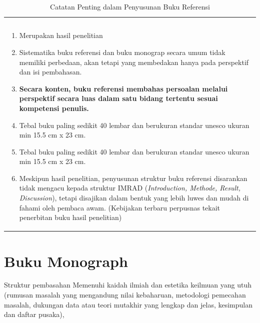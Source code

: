 \documentclass{bukupedia}
\begin{document}
\begin{table}[htbp]
  \centering
  \caption{Catatan Penting dalam Penyusunan Buku Referensi}
  \label{tab:buku-referensi}
  {\fontsize{8}{10}\selectfont
  \begin{tabularx}{\textwidth}{|X|}
    \hline
    \rowcolor{kepalatabel}
    \multicolumn{1}{|c|}{\bfseries CATATAN PENTING YANG PERLU DICERMATI} \\
    \rowcolor{kepalatabel}
    \multicolumn{1}{|c|}{\bfseries PENYUSUNAN BUKU REFERENSI} \\
    \hline
    \begin{enumerate}[leftmargin=*, nosep, before=\vspace{2pt}, after=\vspace{2pt}]
      \item Merupakan hasil penelitian
      \item Sistematika buku referensi dan buku monograp secara umum
            tidak memiliki perbedaan, akan tetapi yang membedakan hanya
            pada perspektif dan isi pembahasan.
      \item \textbf{Secara konten, buku referensi membahas persoalan
            melalui perspektif secara luas dalam satu bidang tertentu
            sesuai kompetensi penulis.}
      \item Tebal buku paling sedikit 40 lembar dan berukuran standar
            unesco ukuran min 15.5 cm x 23 cm.
      \item Tebal buku paling sedikit 40 lembar dan berukuran standar
            unesco ukuran min 15.5 cm x 23 cm.
      \item Meskipun hasil penelitian, penyusunan struktur buku
            referensi disarankan tidak mengacu kepada struktur IMRAD
            (\textit{Introduction, Methode, Result, Discussion}), tetapi
            disajikan dalam bentuk yang lebih luwes dan mudah di fahami
            oleh pembaca awam. (Kebijakan terbaru perpusnas tekait
            penerbitan buku hasil penelitian)
    \end{enumerate} \\
    \hline
  \end{tabularx}}
\end{table}

\section{Buku Monograph}
Struktur pembasahan Memenuhi kaidah ilmiah dan estetika keilmuan yang
utuh (rumusan masalah yang mengandung nilai kebaharuan, metodologi
pemecahan masalah, dukungan data atau teori mutakhir yang lengkap dan
jelas, kesimpulan dan daftar pusaka),
\end{document}
